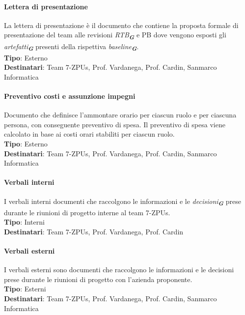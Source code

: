 \documentclass[a4paper,12pt]{article}
\newcommand{\glossario}[1]{\textit{#1}\textsubscript{\textbf{\textit{\textcolor{lightblack}{G}}}}}
\begin{document}
\paragraph{Lettera di presentazione}\label{letteraDiPresentazione}
La lettera di presentazione è il documento che contiene la proposta formale di
presentazione del team alle revisioni \glossario{RTB} e PB dove vengono esposti gli
\glossario{artefatti} presenti della rispettiva \glossario{baseline}. \\
\textbf{Tipo}: Esterno \\ \textbf{Destinatari}: Team 7-ZPUs, Prof. Vardanega,
Prof. Cardin, Sanmarco Informatica \\

\paragraph{Preventivo costi e assunzione impegni}\label{preventivoCostiEAssunzioneImpegni}
Documento che definisce l'ammontare orario per ciascun ruolo e per ciascuna
persona, con conseguente preventivo di spesa. Il preventivo di spesa viene
calcolato in base ai costi orari stabiliti per ciascun ruolo. \\ \textbf{Tipo}:
Esterno \\ \textbf{Destinatari}: Team 7-ZPUs, Prof. Vardanega, Prof. Cardin,
Sanmarco Informatica \\

\paragraph{Verbali interni}
I verbali interni documenti che raccolgono le informazioni e le
\glossario{decisioni} prese durante le riunioni di progetto interne al team
7-ZPUs. \\ \textbf{Tipo}: Interni \\ \textbf{Destinatari}: Team 7-ZPUs, Prof.
Vardanega, Prof. Cardin \\

\paragraph{Verbali esterni}
I verbali esterni sono documenti che raccolgono le informazioni e le decisioni
prese durante le riunioni di progetto con l'azienda proponente. \\
\textbf{Tipo}: Esterni \\ \textbf{Destinatari}: Team 7-ZPUs, Prof. Vardanega,
Prof. Cardin, Sanmarco Informatica \\
\end{document}

